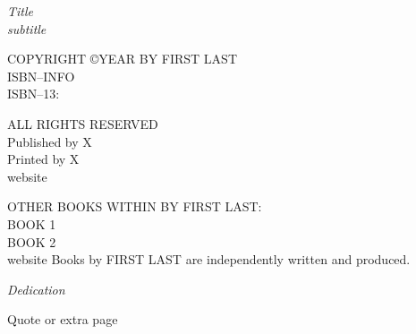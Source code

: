 \newpage

\null\vfill

\begin{flushleft}
 \thispagestyle{empty} %
\textit{Title \\ subtitle\\}
\bigskip

COPYRIGHT \copyright YEAR BY FIRST LAST \\
ISBN--INFO \\
ISBN--13:   \\
\bigskip


ALL RIGHTS RESERVED \\
Published by X\\
Printed by X \\
\bigskip
website


\newpage

\begin{vplace}[0.1]
  \thispagestyle{empty}
  \center
\bigskip
 \LARGE OTHER BOOKS WITHIN BY FIRST LAST:\\
\bigskip
  \normalsize  BOOK 1 \\
\smallskip
   BOOK 2 \\
 \bigskip
 \bigskip
 \center website
\bigskip
\bigskip
 \center Books by FIRST LAST are independently written and produced.\\
\end{vplace}
\newpage


\end{flushleft}

\let\cleardoublepage\clearpage

\begingroup
  \pagestyle{empty}
\begin{vplace}[0.3]
 \textit{Dedication}
\end{vplace}
  \newpage
  \begin{vplace}[0.3]
  \raggedright
 Quote or extra page
   \end{vplace}
  \newpage
  \null
  \newpage
\endgroup